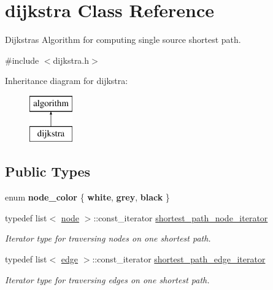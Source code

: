 \hypertarget{classdijkstra}{}\section{dijkstra Class Reference}
\label{classdijkstra}


Dijkstra\textquotesingle{}s Algorithm for computing single source shortest path.  




{\ttfamily \#include $<$dijkstra.\+h$>$}

Inheritance diagram for dijkstra\+:\begin{figure}[H]
\begin{center}
\leavevmode
\includegraphics[height=2.000000cm]{classdijkstra}
\end{center}
\end{figure}
\subsection*{Public Types}
\begin{DoxyCompactItemize}
\item 
\mbox{\label{classdijkstra_a2bdd8d3b57860b5715d01e65664e810f}} 
enum {\bfseries node\+\_\+color} \{ {\bfseries white}, 
{\bfseries grey}, 
{\bfseries black}
 \}
\item 
\mbox{\label{classdijkstra_a5062e9a8339848666efcf2143c4c1881}} 
typedef list$<$ \mbox{\hyperlink{classnode}{node}} $>$\+::const\+\_\+iterator \mbox{\hyperlink{classdijkstra_a5062e9a8339848666efcf2143c4c1881}{shortest\+\_\+path\+\_\+node\+\_\+iterator}}
\begin{DoxyCompactList}\small\item\em Iterator type for traversing nodes on one shortest path. \end{DoxyCompactList}\item 
\mbox{\label{classdijkstra_ad35d95d4ed7a4202a5d048a63aa115b9}} 
typedef list$<$ \mbox{\hyperlink{classedge}{edge}} $>$\+::const\+\_\+iterator \mbox{\hyperlink{classdijkstra_ad35d95d4ed7a4202a5d048a63aa115b9}{shortest\+\_\+path\+\_\+edge\+\_\+iterator}}
\begin{DoxyCompactList}\small\item\em Iterator type for traversing edges on one shortest path. \end{DoxyCompactList}\end{DoxyCompactItemize}
